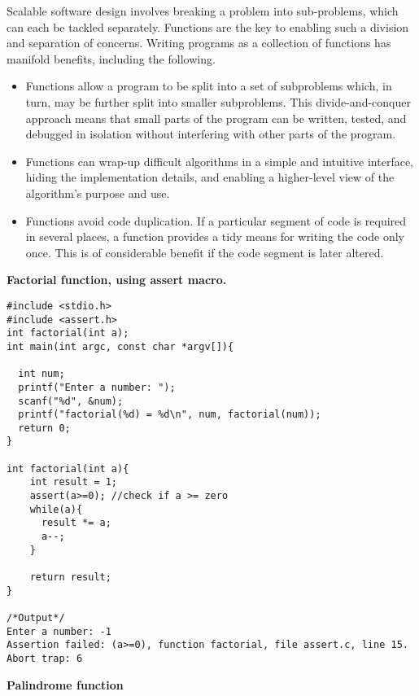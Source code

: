\documentclass[10pt, a4paper, twocolumn]{article} %
\begin{document}
Scalable software design involves breaking a problem into sub-problems, which can each be tackled separately. Functions are the key to enabling such a division and separation of concerns.
Writing programs as a collection of functions has manifold benefits, including the following.
\newline
\begin{itemize}
	\item Functions allow a program to be split into a set of subproblems which, in turn, may be further split into smaller subproblems. This divide-and-conquer approach means that small parts of the program can be written, tested, and debugged in isolation without interfering with other parts of the program.
\newline
	\item Functions can wrap-up difficult algorithms in a simple and intuitive interface, hiding the implementation details, and enabling a higher-level view of the algorithm’s purpose and use.
\newline
	\item Functions avoid code duplication. If a particular segment of code is required in several places, a function provides a tidy means for writing the code only once. This is of considerable benefit if the code segment is later altered.
\end{itemize}

\textbf{Factorial function, using assert macro.}

\begin{lstlisting}
#include <stdio.h>
#include <assert.h>
int factorial(int a);
int main(int argc, const char *argv[]){

  int num;
  printf("Enter a number: ");
  scanf("%d", &num);
  printf("factorial(%d) = %d\n", num, factorial(num));
  return 0;
}

int factorial(int a){
    int result = 1;
    assert(a>=0); //check if a >= zero
    while(a){
      result *= a;
      a--;
    }

    return result;
}

/*Output*/
Enter a number: -1
Assertion failed: (a>=0), function factorial, file assert.c, line 15.
Abort trap: 6
\end{lstlisting}

\textbf{Palindrome function}
\end{document}
